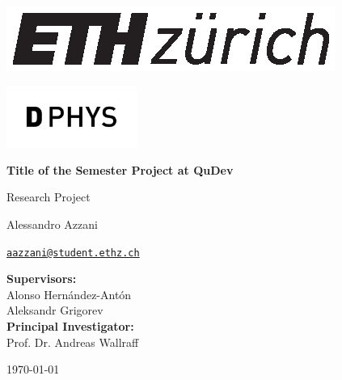 \begin{titlepage}
    \noindent
    \begin{minipage}{0.4\textwidth}
        \begin{flushleft}
            \includegraphics[height=2.cm]{Title/eth_logo.eps}
        \end{flushleft}
    \end{minipage}
    \hfill
    \begin{minipage}{0.4\textwidth}
        \begin{flushright}
            \includegraphics[height=2cm]{Title/dphys.png}
        \end{flushright}
    \end{minipage}

    \vspace{3cm}

    \begin{center}
        \begin{spacing}{2.0}
            {\huge \bfseries Title of the Semester Project at QuDev}
        \end{spacing}

        \large
        Research Project
    \end{center}

    \vspace{1.2cm}

    \begin{center}
        \large
        Alessandro Azzani

        \begingroup
            \hypersetup{urlcolor=black}
            \href{mailto:aazzani@student.ethz.ch}
            {\texttt{\small aazzani@student.ethz.ch}} 
        \endgroup
    \end{center}

    \vfill

    \begin{center}
        \textbf{Supervisors:} \\
        Alonso Hernández-Antón \\
        Aleksandr Grigorev \\

        \vspace{0.2cm}
        \textbf{Principal Investigator:} \\
        Prof. Dr. Andreas Wallraff
    \end{center}

    \vspace{0.5cm}

    \begin{center}
        \today
    \end{center}
\end{titlepage}